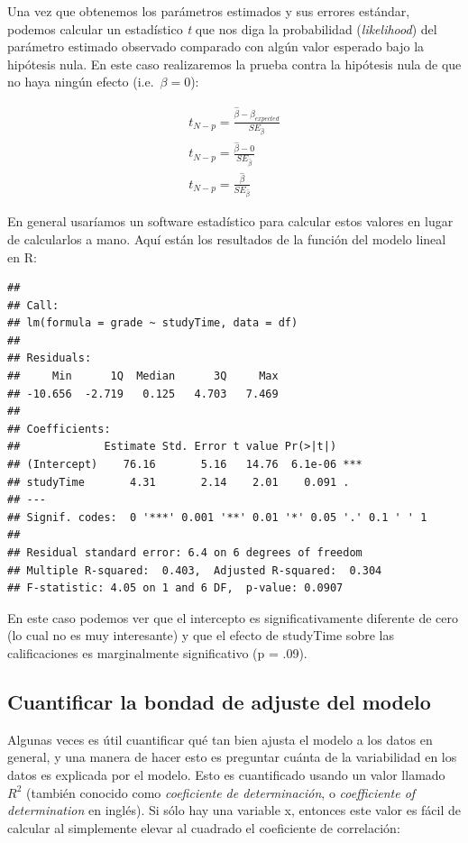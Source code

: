 \documentclass[
  12pt,
]{book}
\theoremstyle{definition}
\theoremstyle{definition}
\theoremstyle{definition}
\theoremstyle{remark}
\begin{document}
Una vez que obtenemos los parámetros estimados y sus errores estándar, podemos calcular un estadístico \emph{t} que nos diga la probabilidad (\emph{likelihood}) del parámetro estimado observado comparado con algún valor esperado bajo la hipótesis nula. En este caso realizaremos la prueba contra la hipótesis nula de que no haya ningún efecto (i.e.~\(\beta=0\)):

\[
\begin{array}{c}
t_{N - p} = \frac{\hat{\beta} - \beta_{expected}}{SE_{\hat{\beta}}}\\
t_{N - p} = \frac{\hat{\beta} - 0}{SE_{\hat{\beta}}}\\
t_{N - p} = \frac{\hat{\beta} }{SE_{\hat{\beta}}}
\end{array}
\]

En general usaríamos un software estadístico para calcular estos valores en lugar de calcularlos a mano. Aquí están los resultados de la función del modelo lineal en R:

\begin{verbatim}
## 
## Call:
## lm(formula = grade ~ studyTime, data = df)
## 
## Residuals:
##     Min      1Q  Median      3Q     Max 
## -10.656  -2.719   0.125   4.703   7.469 
## 
## Coefficients:
##             Estimate Std. Error t value Pr(>|t|)    
## (Intercept)    76.16       5.16   14.76  6.1e-06 ***
## studyTime       4.31       2.14    2.01    0.091 .  
## ---
## Signif. codes:  0 '***' 0.001 '**' 0.01 '*' 0.05 '.' 0.1 ' ' 1
## 
## Residual standard error: 6.4 on 6 degrees of freedom
## Multiple R-squared:  0.403,	Adjusted R-squared:  0.304 
## F-statistic: 4.05 on 1 and 6 DF,  p-value: 0.0907
\end{verbatim}

En este caso podemos ver que el intercepto es significativamente diferente de cero (lo cual no es muy interesante) y que el efecto de studyTime sobre las calificaciones es marginalmente significativo (p = .09).

\hypertarget{cuantificar-la-bondad-de-adjuste-del-modelo}{%
\subsection{Cuantificar la bondad de adjuste del modelo}\label{cuantificar-la-bondad-de-adjuste-del-modelo}}

Algunas veces es útil cuantificar qué tan bien ajusta el modelo a los datos en general, y una manera de hacer esto es preguntar cuánta de la variabilidad en los datos es explicada por el modelo. Esto es cuantificado usando un valor llamado \(R^2\) (también conocido como \emph{coeficiente de determinación}, o \emph{coefficiente of determination} en inglés). Si sólo hay una variable x, entonces este valor es fácil de calcular al simplemente elevar al cuadrado el coeficiente de correlación:
\end{document}
